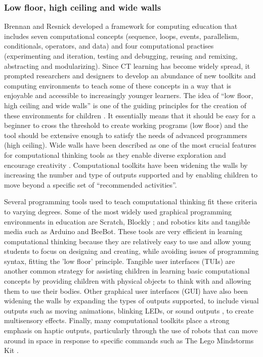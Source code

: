 \documentclass[oneside,%
                    author={Malak Hajji},
                    degree={BSc},
                    title={Designing An Accessible Computational Toolkit For Students},
                  subtitle={With Mixed Visual Abilities}]{dissertation}
\begin{document}
\subsubsection{Low floor, high ceiling and wide walls}

Brennan and Resnick \cite{resnick11} developed a framework for computing education that includes seven computational concepts (sequence, loops, events, parallelism, conditionals, operators, and data) and four computational practises (experimenting and iteration, testing and debugging, reusing and remixing, abstracting and modularizing). Since CT learning has become widely spread, it prompted researchers and designers to develop an abundance of new toolkits and computing environments to teach some of these concepts in a way that is enjoyable and accessible to increasingly younger learners. The idea of “low floor, high ceiling and wide walls” is one of the guiding principles for the creation of these environments for children \cite{CB-lowfloor}. It essentially means that it should be easy for a beginner to cross the threshold to create working programs (low floor) and the tool should be extensive enough to satisfy the needs of advanced programmers (high ceiling). Wide walls have been described as one of the most crucial features for computational thinking tools as they enable diverse exploration and encourage creativity \cite{CB-lowfloor}. Computational toolkits have been widening the walls by increasing the number and type of outputs supported and by enabling children to move beyond a specific set of “recommended activities”. 

Several programming tools used to teach computational thinking fit these criteria to varying degrees. Some of the most widely used graphical programming environments in education are Scratch\cite{scratch}, Blockly \cite{blockly}; and robotics kits and tangible media such as Arduino and BeeBot. These tools are very efficient in learning computational thinking because they are relatively easy to use and allow young students to focus on designing and creating, while avoiding issues of programming syntax, fitting the 'low floor' principle. Tangible user interfaces (TUIs) are another common strategy for assisting children in learning basic computational concepts by providing children with physical objects to think with and allowing them to use their bodies. Other graphical user interfaces (GUI) have also been widening the walls by expanding the  types of outputs supported, to include visual outputs such as moving animations, blinking LEDs, or sound outputs \cite{lee}, to create multisensory effects\cite{multisensory,scratch}. Finally, many computational toolkits place a strong emphasis on haptic outputs, particularly through the use of robots that can move around in space in response to specific commands such as The Lego Mindstorms Kit \cite{lego-mindstorm}.
\end{document}
